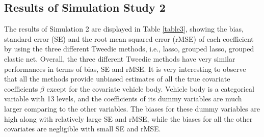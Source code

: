\documentclass[paper=a4, fontsize=11pt]{scrartcl} %
\begin{document}
\newpage

\subsection*{\textbf{Results of Simulation Study 2}}
The results of Simulation 2 are displayed in Table \ref{table3}, showing the bias, standard error (SE) and the root mean squared error (rMSE) of each coefficient by using the three different Tweedie methods, i.e., lasso, grouped lasso, grouped elastic net. Overall, the three different Tweedie methods have very similar performances in terms of bias, SE and rMSE. It is very interesting to observe that all the methods provide unbiased estimates of all the true covariate coefficients $\beta$ except for the covariate vehicle body. Vehicle body is a categorical variable with 13 levels, and the coefficients of its dummy variables are much larger comparing to the other variables. The biases for these dummy variables are high along with relatively large SE and rMSE, while the biases for all the other covariates are negligible with small SE and rMSE.\\
 
\end{document}

